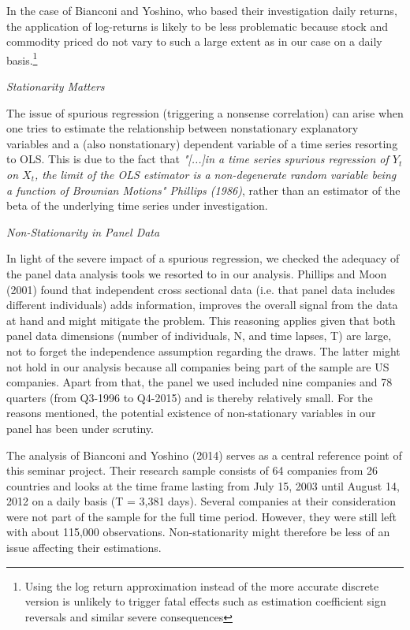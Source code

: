 \documentclass[a4paper]{article}
\begin{document}
In the case of Bianconi and Yoshino, who based their investigation daily returns, the application of log-returns is likely to be less problematic because stock and commodity priced do not vary to such a large extent as in our case on a daily basis.\footnote{Using the log return approximation instead of the more accurate discrete version is unlikely to trigger fatal effects such as estimation coefficient sign reversals and similar severe consequences}  

\emph{Stationarity Matters}

The issue of spurious regression (triggering a nonsense correlation) can arise when one tries to estimate the relationship between nonstationary explanatory variables and a (also nonstationary) dependent variable of a time series resorting to OLS. This is due to the fact that
\emph{"[...]in a time series spurious regression of $Y_t$ on $X_t$, the limit of the OLS estimator is a non-degenerate random variable being a function of Brownian Motions" Phillips (1986)},
rather than an estimator of the beta of the underlying time series under investigation. 

\emph{Non-Stationarity in Panel Data}

In light of the severe impact of a spurious regression, we checked the adequacy of the panel data analysis tools we resorted to in our analysis. Phillips and Moon (2001) found that independent cross sectional data (i.e. that panel data includes different individuals) adds information, improves the overall signal from the data at hand and might mitigate the problem. This reasoning applies given that both panel data dimensions (number of individuals, N, and time lapses, T) are large, not to forget the independence assumption regarding the draws. The latter might not hold in our analysis because all companies being part of the sample are US companies. Apart from that, the panel we used included nine companies and 78 quarters (from Q3-1996 to Q4-2015) and is thereby relatively small. For the reasons mentioned, the potential existence of non-stationary variables in our panel has been under scrutiny. 

The analysis of Bianconi and Yoshino (2014) serves as a central reference point of this seminar project. Their research sample consists of 64 companies from 26 countries and looks at the time frame lasting from July 15, 2003 until August 14, 2012 on a daily basis (T = 3,381 days). Several companies at their consideration were not part of the sample for the full time period. However, they were still left with about 115,000 observations. Non-stationarity might therefore be less of an issue affecting their estimations. 
\end{document}

